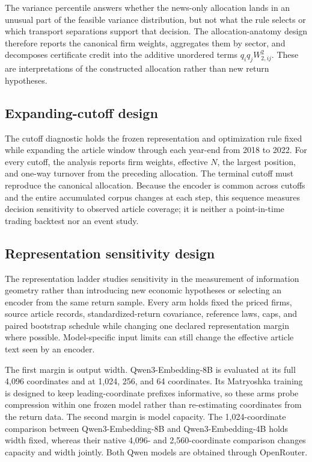 The variance percentile answers whether the news-only allocation lands in an
unusual part of the feasible variance distribution, but not what the rule
selects or which transport separations support that decision.
The allocation-anatomy design therefore reports the canonical firm weights,
aggregates them by sector, and decomposes certificate credit into the additive
unordered terms $q_i q_j W_{2,ij}^{2}$.
These are interpretations of the constructed allocation rather than new
return hypotheses.

\subsection{Expanding-cutoff design}
\label{sec:p3-cutoff-design}

The cutoff diagnostic holds the frozen representation and optimization
rule fixed while expanding the article window through each year-end from 2018
to 2022.
For every cutoff, the analysis reports firm weights, effective $N$, the largest
position, and one-way turnover from the preceding allocation.
The terminal cutoff must reproduce the canonical allocation.
Because the encoder is common across cutoffs and the entire accumulated corpus
changes at each step, this sequence measures decision sensitivity to observed
article coverage; it is neither a point-in-time trading backtest nor an event
study.

\subsection{Representation sensitivity design}
\label{sec:p3-representation-design}

The representation ladder studies sensitivity in the measurement of
information geometry rather than introducing new economic hypotheses or
selecting an encoder from the same return sample.
Every arm holds fixed the priced firms, source article records,
standardized-return covariance, reference laws, caps, and paired bootstrap
schedule while changing one declared representation margin where possible.
Model-specific input limits can still change the effective article text seen by
an encoder.

The first margin is output width.
Qwen3-Embedding-8B is evaluated at its full 4,096 coordinates and at 1,024,
256, and 64 coordinates.
Its Matryoshka training is designed to keep leading-coordinate prefixes
informative, so these arms probe compression within one frozen model rather than
re-estimating coordinates from the return data.
The second margin is model capacity.
The 1,024-coordinate comparison between Qwen3-Embedding-8B and
Qwen3-Embedding-4B holds width fixed, whereas their native 4,096- and
2,560-coordinate comparison changes capacity and width jointly.
Both Qwen models are obtained through OpenRouter.

